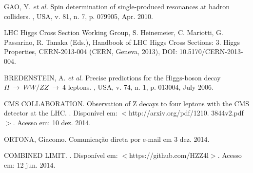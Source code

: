 \begin{thebibliography}{}
GAO, Y. \textit{et al.}
\newblock Spin determination of single-produced resonances at hadron colliders.
, USA, v. 81, n. 7, p. 079905, Apr. 2010.

\newblock LHC Higgs Cross Section Working Group, S. Heinemeier, C. Mariotti, G. Passarino, R. Tanaka (Eds.), Handbook of LHC Higgs Cross Sections: 3. Higgs Properties, CERN-2013-004 (CERN, Geneva, 2013), DOI: 10.5170/CERN-2013-004.

BREDENSTEIN, A. \textit{et al.}
\newblock Precise predictions for the Higgs-boson decay $H~\rightarrow~WW/ZZ~\rightarrow~4$ leptons.
, USA, v. 74, n. 1, p. 013004, July 2006.

CMS COLLABORATION.
\newblock Observation of Z decays to four leptons with the CMS detector at the LHC.
. Disponível em: $<$http://arxiv.org/pdf/1210. 3844v2.pdf$>$. Acesso em: 10 dez. 2014.

ORTONA, Giacomo.
\newblock Comunicação direta por e-mail em 3 dez. 2014.

COMBINED LIMIT.
.
\newblock Disponível em: $<$https://github.com/HZZ4l$>$. Acesso em: 12 jun. 2014.

\end{thebibliography}